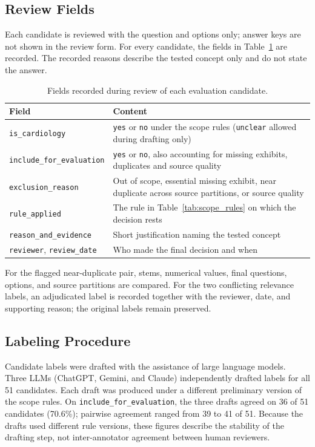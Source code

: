 \subsection{Review Fields}

Each candidate is reviewed with the question and options only; answer keys are not shown in the review form. For every candidate, the fields in Table~\ref{tab:review_fields} are recorded. The recorded reasons describe the tested concept only and do not state the answer.

\begin{table}[H]
\centering
\caption{Fields recorded during review of each evaluation candidate.}
\label{tab:review_fields}
\begin{tabularx}{\linewidth}{l >{\raggedright\arraybackslash}X}
\toprule
Field & Content \\
\midrule
\texttt{is\_cardiology} & \texttt{yes} or \texttt{no} under the scope rules (\texttt{unclear} allowed during drafting only) \\
\texttt{include\_for\_evaluation} & \texttt{yes} or \texttt{no}, also accounting for missing exhibits, duplicates and source quality \\
\texttt{exclusion\_reason} & Out of scope, essential missing exhibit, near duplicate across source partitions, or source quality \\
\texttt{rule\_applied} & The rule in Table~\ref{tab:scope_rules} on which the decision rests \\
\texttt{reason\_and\_evidence} & Short justification naming the tested concept \\
\texttt{reviewer}, \texttt{review\_date} & Who made the final decision and when \\
\bottomrule
\end{tabularx}
\end{table}

For the flagged near-duplicate pair, stems, numerical values, final questions, options, and source partitions are compared. For the two conflicting relevance labels, an adjudicated label is recorded together with the reviewer, date, and supporting reason; the original labels remain preserved.

\subsection{Labeling Procedure}

Candidate labels were drafted with the assistance of large language models. Three LLMs (ChatGPT, Gemini, and Claude) independently drafted labels for all 51 candidates. Each draft was produced under a different preliminary version of the scope rules. On \texttt{include\_for\_evaluation}, the three drafts agreed on 36 of 51 candidates (70.6\%); pairwise agreement ranged from 39 to 41 of 51. Because the drafts used different rule versions, these figures describe the stability of the drafting step, not inter-annotator agreement between human reviewers.


